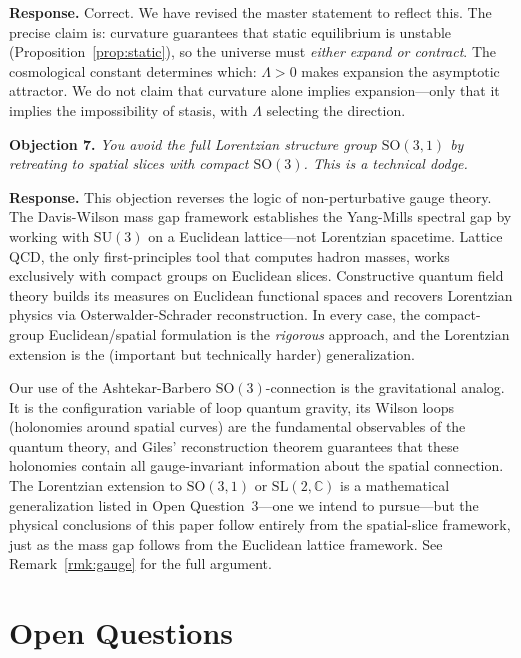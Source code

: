 \documentclass[12pt]{amsart}
\theoremstyle{definition}
\begin{document}
\textbf{Response.}  Correct.  We have revised the master statement to reflect this.  The precise claim is: curvature guarantees that static equilibrium is unstable (Proposition~\ref{prop:static}), so the universe must \emph{either expand or contract}.  The cosmological constant determines which: $\Lambda > 0$ makes expansion the asymptotic attractor.  We do not claim that curvature alone implies expansion---only that it implies the impossibility of stasis, with $\Lambda$ selecting the direction.

\textbf{Objection 7.}  \emph{You avoid the full Lorentzian structure group $\mathrm{SO}(3,1)$ by retreating to spatial slices with compact $\mathrm{SO}(3)$.  This is a technical dodge.}

\textbf{Response.}  This objection reverses the logic of non-perturbative gauge theory.  The Davis-Wilson mass gap framework \cite{davis2026ym} establishes the Yang-Mills spectral gap by working with $\mathrm{SU}(3)$ on a Euclidean lattice---not Lorentzian spacetime.  Lattice QCD, the only first-principles tool that computes hadron masses, works exclusively with compact groups on Euclidean slices.  Constructive quantum field theory builds its measures on Euclidean functional spaces and recovers Lorentzian physics via Osterwalder-Schrader reconstruction.  In every case, the compact-group Euclidean/spatial formulation is the \emph{rigorous} approach, and the Lorentzian extension is the (important but technically harder) generalization.

Our use of the Ashtekar-Barbero $\mathrm{SO}(3)$-connection is the gravitational analog.  It is the configuration variable of loop quantum gravity, its Wilson loops (holonomies around spatial curves) are the fundamental observables of the quantum theory, and Giles' reconstruction theorem \cite{giles1981} guarantees that these holonomies contain all gauge-invariant information about the spatial connection.  The Lorentzian extension to $\mathrm{SO}(3,1)$ or $\mathrm{SL}(2,\mathbb{C})$ is a mathematical generalization listed in Open Question~3---one we intend to pursue---but the physical conclusions of this paper follow entirely from the spatial-slice framework, just as the mass gap follows from the Euclidean lattice framework.  See Remark~\ref{rmk:gauge} for the full argument.


\section{Open Questions}
\label{sec:open}
\end{document}

